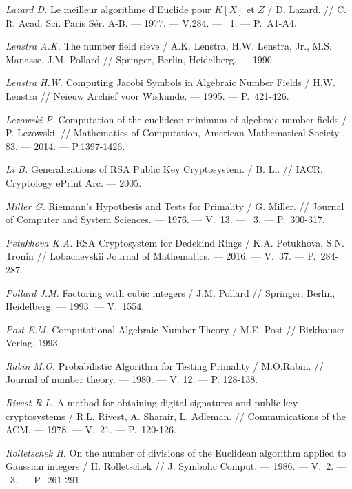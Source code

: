 \begin{thebibliography}{99}
    \textit{Lazard D.} Le meilleur algorithme d'{E}uclide pour {$K[X]$} et {$Z$} / D. Lazard. // C. R. Acad. Sci. Paris S\'er. A-B. --- 1977. --- V.284. --- \textnumero~1. --- P.~A1-A4.
    
    \textit{Lenstra A.K.} The number field sieve / A.K. Lenstra, H.W. Lenstra, Jr., M.S. Manasse, J.M. Pollard // Springer, Berlin, Heidelberg. --- 1990.

    \textit{Lenstra H.W.} Computing Jacobi Symbols in Algebraic Number Fields / H.W. Lenstra // Neieuw Archief voor Wiskunde. --- 1995. --- P.~421-426.

    \textit{Lezowski P.} Computation of the euclidean minimum of algebraic number fields / P. Lezowski. // Mathematics of Computation, American Mathematical Society 83. --- 2014. --- P.1397-1426.

    \textit{Li B.} Generalizations of RSA Public Key Cryptosystem. / B. Li. // IACR, Cryptology ePrint Arc. --- 2005.

    \textit{Miller G.} Riemann's Hypothesis and Tests for Primality / G. Miller. // Journal of Computer and System Sciences. --- 1976. --- V.~13. --- ~3. --- {P.}~300-317.
    
    \textit{Petukhova K.A.} RSA Cryptosystem for Dedekind Rings / K.A. Petukhova, S.N. Tronin // Lobachevskii Journal of Mathematics. --- 2016. --- V.~37. --- P.~284-287.
    
    \textit{Pollard J.M.} Factoring with cubic integers / J.M. Pollard // Springer, Berlin, Heidelberg. --- 1993. --- V.~1554.

    \textit{Post E.M.} Computational Algebraic Number Theory / M.E. Post // Birkhauser Verlag, 1993.

    \textit{Rabin M.O.} Probabilistic Algorithm for Testing Primality / M.O.Rabin. // Journal of number theory. --- 1980. --- V. 12. --- P. 128-138.
    
    \textit{Rivest R.L.} A method for obtaining digital signatures and public-key cryptosystems / R.L. Rivest, A. Shamir, L. Adleman. // Communications of the ACM. --- 1978. --- V.~21. --- P.~120-126.
    
    \textit{Rolletschek H.} On the number of divisions of the Euclidean algorithm applied to Gaussian integers / H. Rolletschek // J. Symbolic Comput. --- 1986. --- V.~2. --- \textnumero~3. --- P.~261-291.
    

\end{thebibliography}
